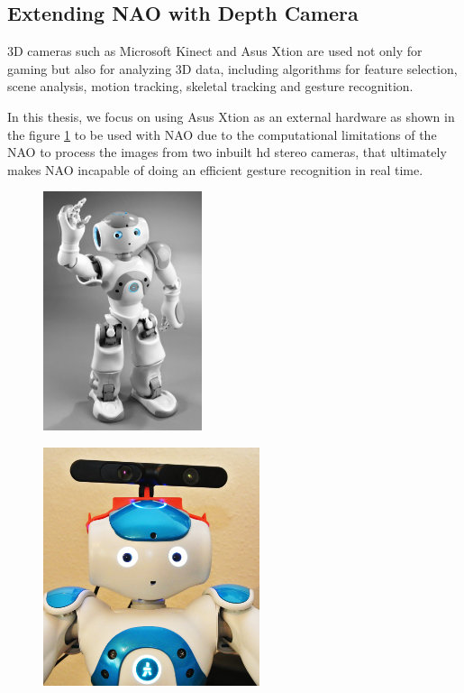 \subsection{Extending NAO with Depth Camera} 
3D cameras such as Microsoft Kinect and Asus Xtion are used not only for gaming but also for analyzing 3D data, including algorithms for feature selection, scene analysis, motion tracking, skeletal tracking and gesture recognition. 

In this thesis, we focus on using Asus Xtion as an external hardware as shown in the figure \ref{fig:xtion} to be used with NAO due to the computational limitations of the NAO to process the images from two inbuilt hd stereo cameras, that ultimately makes NAO incapable of doing an efficient gesture recognition in real time.

\begin{figure}
	\centering
	\begin{minipage}{.5\textwidth}
		\centering
\includegraphics[height=7cm]{figures/nao.png} 
		\label{fig:nao}
	\end{minipage}%
	\begin{minipage}{.5\textwidth}
		\centering
\includegraphics[height=7cm]{figures/nao-xtion.png} 
		\label{fig:xtion}
	\end{minipage}
\end{figure}


